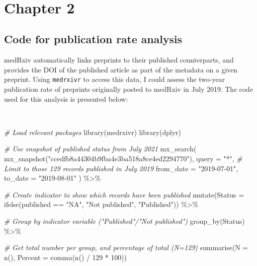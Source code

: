 \documentclass[a4paper, twoside]{templates/ociamthesis}
\newenvironment{Shaded}{\begin{snugshade}}{\end{snugshade}}
\newcommand{\AttributeTok}[1]{\textcolor[rgb]{0.77,0.63,0.00}{#1}}
\newcommand{\CommentTok}[1]{\textcolor[rgb]{0.56,0.35,0.01}{\textit{#1}}}
\newcommand{\DecValTok}[1]{\textcolor[rgb]{0.00,0.00,0.81}{#1}}
\newcommand{\FunctionTok}[1]{\textcolor[rgb]{0.00,0.00,0.00}{#1}}
\newcommand{\NormalTok}[1]{#1}
\newcommand{\SpecialCharTok}[1]{\textcolor[rgb]{0.00,0.00,0.00}{#1}}
\newcommand{\StringTok}[1]{\textcolor[rgb]{0.31,0.60,0.02}{#1}}
\renewenvironment{Shaded}
{
  \vspace{4pt}%
  \begin{snugshade}%
}{%
  \end{snugshade}%
  \vspace{4pt}%
}
\begin{document}
~

\hypertarget{appendix-sys-rev-tools}{%
\section{Chapter 2}\label{appendix-sys-rev-tools}}

\hypertarget{appendix-tools-pub}{%
\subsection{Code for publication rate analysis}\label{appendix-tools-pub}}

medRxiv automatically links preprints to their published counterparts, and provides the DOI of the published article as part of the metadata on a given preprint. Using \texttt{medrxivr} to access this data, I could assess the two-year publication rate of preprints originally posted to medRxiv in July 2019. The code used for this analysis is presented below:

~

\begin{Shaded}
\begin{Highlighting}[]
\CommentTok{\# Load relevant packages}
\FunctionTok{library}\NormalTok{(medrxivr)}
\FunctionTok{library}\NormalTok{(dplyr)}

\CommentTok{\# Use snapshot of published status from July 2021}
  \FunctionTok{mx\_search}\NormalTok{(}
    \FunctionTok{mx\_snapshot}\NormalTok{(}\StringTok{"ccedfb8a44304b9fba4e3ba518a8ce4ed2294770"}\NormalTok{),}
    \AttributeTok{query =} \StringTok{"*"}\NormalTok{,}
    \CommentTok{\# Limit to those 129 records published in July 2019}
    \AttributeTok{from\_date =} \StringTok{"2019{-}07{-}01"}\NormalTok{,}
    \AttributeTok{to\_date =} \StringTok{"2019{-}08{-}01"}
\NormalTok{  ) }\SpecialCharTok{\%\textgreater{}\%}
    
\CommentTok{\# Create indicator to show which records have been published}
  \FunctionTok{mutate}\NormalTok{(}\AttributeTok{Status =} \FunctionTok{ifelse}\NormalTok{(published }\SpecialCharTok{==} \StringTok{"NA"}\NormalTok{,}
                          \StringTok{"Not published"}\NormalTok{,}
                          \StringTok{"Published"}\NormalTok{)) }\SpecialCharTok{\%\textgreater{}\%}
    
\CommentTok{\# Group by indicator variable ("Published"/"Not published")}
  \FunctionTok{group\_by}\NormalTok{(Status) }\SpecialCharTok{\%\textgreater{}\%}
    
\CommentTok{\# Get total number per group, and percentage of total (N=129)}
  \FunctionTok{summarise}\NormalTok{(}\AttributeTok{N =} \FunctionTok{n}\NormalTok{(),}
            \AttributeTok{Percent =} \FunctionTok{comma}\NormalTok{(}\FunctionTok{n}\NormalTok{() }\SpecialCharTok{/} \DecValTok{129} \SpecialCharTok{*} \DecValTok{100}\NormalTok{)) }
\end{Highlighting}
\end{Shaded}
\end{document}
